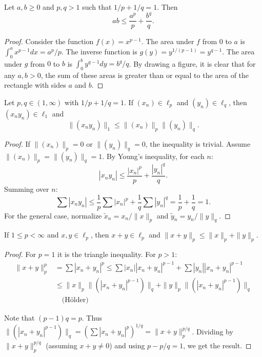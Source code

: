 \begin{lemma}
\label{lemma-young-inequality}
Let $a, b \geq 0$ and $p, q > 1$ such that
$1/p + 1/q = 1$. Then
$$
ab \leq \frac{a^p}{p} + \frac{b^q}{q}.
$$
\end{lemma}

\begin{proof}
Consider the function $f(x) = x^{p-1}$. The
area under $f$ from $0$ to $a$ is $\int_0^a
x^{p-1} dx = a^p/p$. The inverse function is
$g(y) = y^{1/(p-1)} = y^{q-1}$. The area
under $g$ from $0$ to $b$ is $\int_0^b
y^{q-1} dy = b^q/q$. By drawing a figure, it
is clear that for any $a, b > 0$, the sum of
these areas is greater than or equal to the
area of the rectangle with sides $a$ and $b$.
\end{proof}

\begin{theorem}
\label{theorem-holder-inequality-duplicate-2}
Let $p, q \in (1, \infty)$ with $1/p + 1/q =
1$. If $(x_n) \in \ell_p$ and $(y_n) \in
\ell_q$, then $(x_n y_n) \in \ell_1$ and
$$
\|(x_n y_n)\|_1 \leq \|(x_n)\|_p \|(y_n)\|_q.
$$
\end{theorem}

\begin{proof}
If $\|(x_n)\|_p = 0$ or $\|(y_n)\|_q = 0$,
the inequality is trivial. Assume
$\|(x_n)\|_p = \|(y_n)\|_q = 1$. By Young's
inequality, for each $n$:
$$
|x_n y_n| \leq \frac{|x_n|^p}{p} +
\frac{|y_n|^q}{q}.
$$
Summing over $n$:
$$
\sum |x_n y_n| \leq \frac{1}{p} \sum |x_n|^p
+ \frac{1}{q} \sum |y_n|^q = \frac{1}{p} +
\frac{1}{q} = 1.
$$
For the general case, normalize $\tilde{x}_n
= x_n / \|x\|_p$ and $\tilde{y}_n = y_n /
\|y\|_q$.
\end{proof}

\begin{theorem}
\label{theorem-minkowski-inequality-duplicate-2}
If $1 \leq p < \infty$ and $x, y \in \ell_p$,
then $x+y \in \ell_p$ and $\|x+y\|_p \leq
\|x\|_p + \|y\|_p$.
\end{theorem}

\begin{proof}
For $p=1$ it is the triangle inequality. For
$p > 1$:
$$
\begin{aligned}
\|x+y\|_p^p &= \sum |x_n+y_n|^p \leq \sum
|x_n||x_n+y_n|^{p-1} + \sum
|y_n||x_n+y_n|^{p-1} \\ &\leq \|x\|_p
\|(|x_n+y_n|^{p-1})\|_q + \|y\|_p
\|(|x_n+y_n|^{p-1})\|_q \\
&\quad \text{(Hölder)}
\end{aligned}
$$

\noindent
Note that $(p-1)q = p$. Thus
$\|(|x_n+y_n|^{p-1})\|_q = (\sum
|x_n+y_n|^p)^{1/q} = \|x+y\|_p^{p/q}$.
Dividing by $\|x+y\|_p^{p/q}$ (assuming $x+y
\neq 0$) and using $p - p/q = 1$, we get the
result.
\end{proof}

